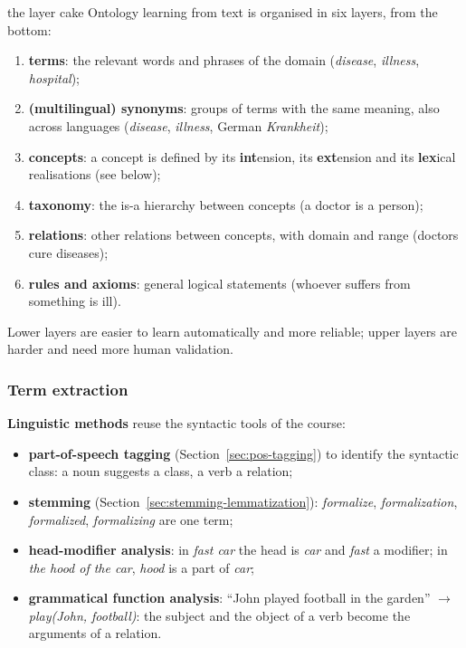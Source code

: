 \begin{nbfact}{the layer cake}
Ontology learning from text is organised in six layers, from the bottom:
\begin{enumerate}[nosep]
  \item \textbf{terms}: the relevant words and phrases of the domain (\emph{disease},
        \emph{illness}, \emph{hospital});
  \item \textbf{(multilingual) synonyms}: groups of terms with the same meaning, also
        across languages (\emph{disease}, \emph{illness}, German \emph{Krankheit});
  \item \textbf{concepts}: a concept is defined by its \textbf{int}ension, its
        \textbf{ext}ension and its \textbf{lex}ical realisations (see below);
  \item \textbf{taxonomy}: the is-a hierarchy between concepts (a doctor is a person);
  \item \textbf{relations}: other relations between concepts, with domain and range
        (doctors cure diseases);
  \item \textbf{rules and axioms}: general logical statements (whoever suffers from
        something is ill).
\end{enumerate}
Lower layers are easier to learn automatically and more reliable; upper layers are
harder and need more human validation.
\end{nbfact}

\subsubsection{Term extraction}

\textbf{Linguistic methods} reuse the syntactic tools of the course:
\begin{itemize}[nosep]
  \item \textbf{part-of-speech tagging} (Section~\ref{sec:pos-tagging}) to identify the
        syntactic class: a noun suggests a class, a verb a relation;
  \item \textbf{stemming} (Section~\ref{sec:stemming-lemmatization}): \emph{formalize},
        \emph{formalization}, \emph{formalized}, \emph{formalizing} are one term;
  \item \textbf{head-modifier analysis}: in \emph{fast car} the head is \emph{car} and
        \emph{fast} a modifier; in \emph{the hood of the car}, \emph{hood} is a part of
        \emph{car};
  \item \textbf{grammatical function analysis}: ``John played football in the garden''
        $\to$ \emph{play(John, football)}: the subject and the object of a verb become
        the arguments of a relation.
\end{itemize}

